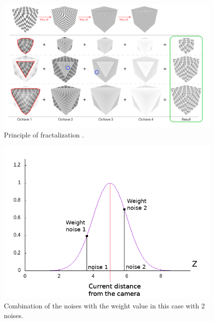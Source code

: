 \begin{figure}[H]
    \begin{center}
    \includegraphics[scale=0.3]{images/fractalization_principle.png}
    \end{center}
    \caption{Principle of fractalization \cite{benard_dynamic_2010}.}
    \label{fractalization_principle}
\end{figure}

\begin{figure}[H]
    \begin{center}
    \includegraphics[scale=0.6]{images/fractal_explained.png}
    \end{center}
    \caption{Combination of the noises with the weight value in this case with 2 noises.}
    \label{fractalization_practical}
\end{figure}


